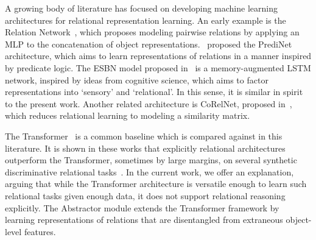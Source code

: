 
% 

A growing body of literature has focused on developing machine learning architectures for relational representation learning. An early example is the Relation Network~\citep{santoro1}, which proposes modeling pairwise relations by applying an MLP to the concatenation of object representations.~\citet{shanahanExplicitlyRelationalNeural} proposed the PrediNet architecture, which aims to learn representations of relations in a manner inspired by predicate logic. The ESBN model proposed in~\citep{esbn} is a memory-augmented LSTM network, inspired by ideas from cognitive science, which aims to factor representations into `sensory' and `relational'. In this sense, it is similar in spirit to the present work. Another related architecture is CoRelNet, proposed in~\citep{kerg2022neural}, which reduces relational learning to modeling a similarity matrix.

The Transformer~\citep{vaswani2017attention} is a common baseline which is compared against in this literature. It is shown in these works that explicitly relational architectures outperform the Transformer, sometimes by large margins, on several synthetic discriminative relational tasks~\citep{shanahanExplicitlyRelationalNeural,esbn,kerg2022neural}. In the current work, we offer an explanation, arguing that while the Transformer architecture is versatile enough to learn such relational tasks given enough data, it does not support relational reasoning explicitly. The Abstractor module extends the Transformer framework by learning representations of relations that are disentangled from extraneous object-level features.

